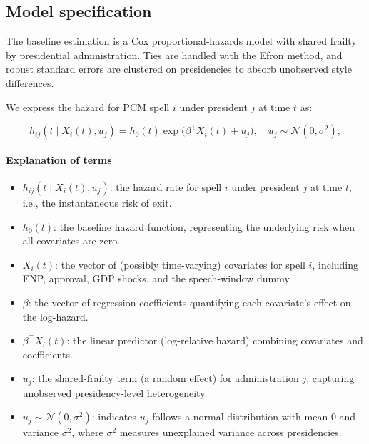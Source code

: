 \documentclass[a4paper, 12pt]{article}
\begin{document}
\subsection{Model specification}

The baseline estimation is a Cox proportional‑hazards model with shared frailty by presidential administration. Ties are handled with the Efron method, and robust standard errors are clustered on presidencies to absorb unobserved style differences.

We express the hazard for PCM spell \(i\) under president \(j\) at time \(t\) as:

\[
  h_{ij}(t \mid X_i(t), u_j)
    = h_0(t) \exp\bigl(\beta^{\mathsf{T}}X_i(t) + u_j\bigr),
  \quad u_j \sim \mathcal{N}(0,\sigma^2),
\]


\paragraph{Explanation of terms}
\begin{itemize}
  \item $h_{ij}(t \mid X_i(t), u_j)$: the hazard rate for spell $i$ under president $j$ at time $t$, i.e., the instantaneous risk of exit.
  \item $h_0(t)$: the baseline hazard function, representing the underlying risk when all covariates are zero.
  \item $X_i(t)$: the vector of (possibly time-varying) covariates for spell $i$, including ENP, approval, GDP shocks, and the speech-window dummy.
  \item $\beta$: the vector of regression coefficients quantifying each covariate’s effect on the log-hazard.
  \item $\beta^\top X_i(t)$: the linear predictor (log-relative hazard) combining covariates and coefficients.
  \item $u_j$: the shared-frailty term (a random effect) for administration $j$, capturing unobserved presidency-level heterogeneity.
  \item $u_j \sim \mathcal{N}(0,\sigma^2)$: indicates $u_j$ follows a normal distribution with mean 0 and variance $\sigma^2$, where $\sigma^2$ measures unexplained variance across presidencies.
\end{itemize}


\end{document}
